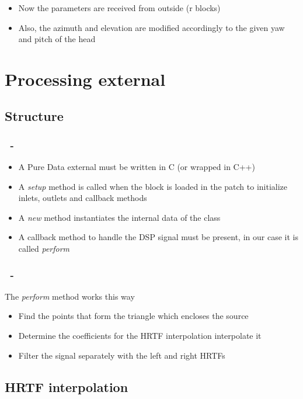 \documentclass{beamer}
\begin{document}
	\begin{frame}
		\frametitle{\insertsection}
		\begin{itemize}
			\item Now the parameters are received from outside (r blocks)
			\item Also, the azimuth and elevation are modified accordingly to the given yaw and pitch of
				the head
		\end{itemize}
	\end{frame}

	\section{Processing external}

	\subsection{Structure}

	\begin{frame}
		\frametitle{\insertsection\ - \insertsubsection}
		\begin{itemize}
			\item A Pure Data external must be written in C (or wrapped in C++)
			\item A {\em setup} method is called when the block is loaded in the patch to initialize inlets,
				outlets and callback methods
			\item A {\em new} method instantiates the internal data of the class
			\item A callback method to handle the DSP signal must be present, in our case it is called {\em perform}
		\end{itemize}
	\end{frame}

	\begin{frame}
		\frametitle{\insertsection\ - \insertsubsection}
		The {\em perform} method works this way
		\begin{itemize}
			\item Find the points that form the triangle which encloses the source
			\item Determine the coefficients for the HRTF interpolation interpolate it
			\item Filter the signal separately with the left and right HRTFs
		\end{itemize}
	\end{frame}

	\subsection{HRTF interpolation}
\end{document}
